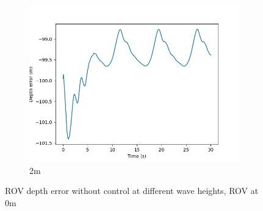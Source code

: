 \documentclass[class=article, crop=false]{standalone}
\begin{document}
\begin{figure}
\begin{subfigure}[b]{0.48\textwidth}
        \centering
        \includegraphics{scenario1/rov-0m/2.0m/rov_depth_error_uncontrolled}
        \caption{2m}
        \label{}
    \end{subfigure}

    \caption{ROV depth error without control at different wave heights, ROV at 0m}
\end{figure}
\end{document}
